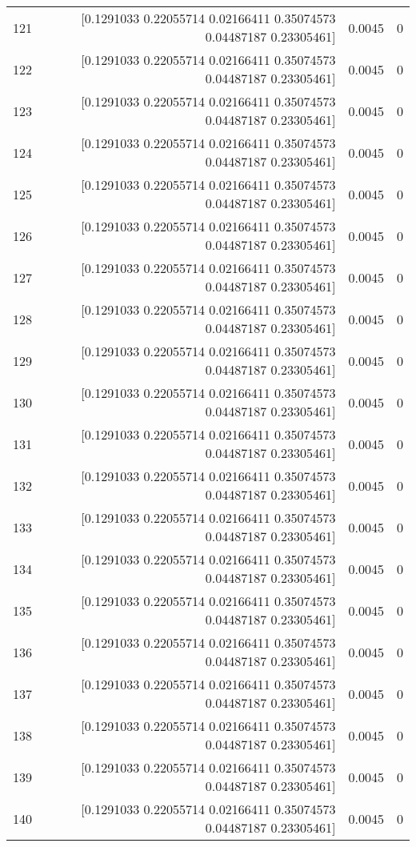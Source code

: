 \begin{longtable}{lrrr}
121 & [0.1291033  0.22055714 0.02166411 0.35074573 0.04487187 0.23305461] & 0.0045 & 0 \\
122 & [0.1291033  0.22055714 0.02166411 0.35074573 0.04487187 0.23305461] & 0.0045 & 0 \\
123 & [0.1291033  0.22055714 0.02166411 0.35074573 0.04487187 0.23305461] & 0.0045 & 0 \\
124 & [0.1291033  0.22055714 0.02166411 0.35074573 0.04487187 0.23305461] & 0.0045 & 0 \\
125 & [0.1291033  0.22055714 0.02166411 0.35074573 0.04487187 0.23305461] & 0.0045 & 0 \\
126 & [0.1291033  0.22055714 0.02166411 0.35074573 0.04487187 0.23305461] & 0.0045 & 0 \\
127 & [0.1291033  0.22055714 0.02166411 0.35074573 0.04487187 0.23305461] & 0.0045 & 0 \\
128 & [0.1291033  0.22055714 0.02166411 0.35074573 0.04487187 0.23305461] & 0.0045 & 0 \\
129 & [0.1291033  0.22055714 0.02166411 0.35074573 0.04487187 0.23305461] & 0.0045 & 0 \\
130 & [0.1291033  0.22055714 0.02166411 0.35074573 0.04487187 0.23305461] & 0.0045 & 0 \\
131 & [0.1291033  0.22055714 0.02166411 0.35074573 0.04487187 0.23305461] & 0.0045 & 0 \\
132 & [0.1291033  0.22055714 0.02166411 0.35074573 0.04487187 0.23305461] & 0.0045 & 0 \\
133 & [0.1291033  0.22055714 0.02166411 0.35074573 0.04487187 0.23305461] & 0.0045 & 0 \\
134 & [0.1291033  0.22055714 0.02166411 0.35074573 0.04487187 0.23305461] & 0.0045 & 0 \\
135 & [0.1291033  0.22055714 0.02166411 0.35074573 0.04487187 0.23305461] & 0.0045 & 0 \\
136 & [0.1291033  0.22055714 0.02166411 0.35074573 0.04487187 0.23305461] & 0.0045 & 0 \\
137 & [0.1291033  0.22055714 0.02166411 0.35074573 0.04487187 0.23305461] & 0.0045 & 0 \\
138 & [0.1291033  0.22055714 0.02166411 0.35074573 0.04487187 0.23305461] & 0.0045 & 0 \\
139 & [0.1291033  0.22055714 0.02166411 0.35074573 0.04487187 0.23305461] & 0.0045 & 0 \\
140 & [0.1291033  0.22055714 0.02166411 0.35074573 0.04487187 0.23305461] & 0.0045 & 0 \\

\end{longtable}
